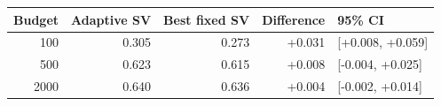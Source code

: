 \begin{tabular}{rrrrl}
\toprule
Budget & Adaptive SV & Best fixed SV & Difference & 95\% CI \\
\midrule
100 & 0.305 & 0.273 & +0.031 & [+0.008, +0.059] \\
500 & 0.623 & 0.615 & +0.008 & [-0.004, +0.025] \\
2000 & 0.640 & 0.636 & +0.004 & [-0.002, +0.014] \\
\bottomrule
\end{tabular}